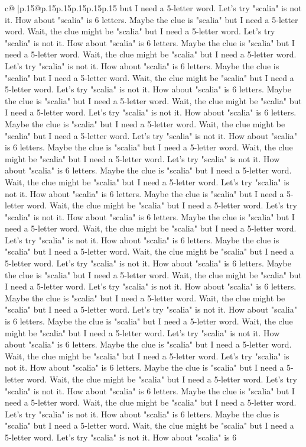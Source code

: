 \documentclass{article}
\begin{document}
{\begin{supertabular}{c@{$\;$}|p{.15\linewidth}@{}p{.15\linewidth}p{.15\linewidth}p{.15\linewidth}p{.15\linewidth}p{.15\linewidth}}
{{{but I need a 5{-}letter word. Let's try "scalia" is not it. How about "scalia" is 6 letters. Maybe the clue is "scalia" but I need a 5{-}letter word. Wait, the clue might be "scalia" but I need a 5{-}letter word. Let's try "scalia" is not it. How about "scalia" is 6 letters. Maybe the clue is "scalia" but I need a 5{-}letter word. Wait, the clue might be "scalia" but I need a 5{-}letter word. Let's try "scalia" is not it. How about "scalia" is 6 letters. Maybe the clue is "scalia" but I need a 5{-}letter word. Wait, the clue might be "scalia" but I need a 5{-}letter word. Let's try "scalia" is not it. How about "scalia" is 6 letters. Maybe the clue is "scalia" but I need a 5{-}letter word. Wait, the clue might be "scalia" but I need a 5{-}letter word. Let's try "scalia" is not it. How about "scalia" is 6 letters. Maybe the clue is "scalia" but I need a 5{-}letter word. Wait, the clue might be "scalia" but I need a 5{-}letter word. Let's try "scalia" is not it. How about "scalia" is 6 letters. Maybe the clue is "scalia" but I need a 5{-}letter word. Wait, the clue might be "scalia" but I need a 5{-}letter word. Let's try "scalia" is not it. How about "scalia" is 6 letters. Maybe the clue is "scalia" but I need a 5{-}letter word. Wait, the clue might be "scalia" but I need a 5{-}letter word. Let's try "scalia" is not it. How about "scalia" is 6 letters. Maybe the clue is "scalia" but I need a 5{-}letter word. Wait, the clue might be "scalia" but I need a 5{-}letter word. Let's try "scalia" is not it. How about "scalia" is 6 letters. Maybe the clue is "scalia" but I need a 5{-}letter word. Wait, the clue might be "scalia" but I need a 5{-}letter word. Let's try "scalia" is not it. How about "scalia" is 6 letters. Maybe the clue is "scalia" but I need a 5{-}letter word. Wait, the clue might be "scalia" but I need a 5{-}letter word. Let's try "scalia" is not it. How about "scalia" is 6 letters. Maybe the clue is "scalia" but I need a 5{-}letter word. Wait, the clue might be "scalia" but I need a 5{-}letter word. Let's try "scalia" is not it. How about "scalia" is 6 letters. Maybe the clue is "scalia" but I need a 5{-}letter word. Wait, the clue might be "scalia" but I need a 5{-}letter word. Let's try "scalia" is not it. How about "scalia" is 6 letters. Maybe the clue is "scalia" but I need a 5{-}letter word. Wait, the clue might be "scalia" but I need a 5{-}letter word. Let's try "scalia" is not it. How about "scalia" is 6 letters. Maybe the clue is "scalia" but I need a 5{-}letter word. Wait, the clue might be "scalia" but I need a 5{-}letter word. Let's try "scalia" is not it. How about "scalia" is 6 letters. Maybe the clue is "scalia" but I need a 5{-}letter word. Wait, the clue might be "scalia" but I need a 5{-}letter word. Let's try "scalia" is not it. How about "scalia" is 6 letters. Maybe the clue is "scalia" but I need a 5{-}letter word. Wait, the clue might be "scalia" but I need a 5{-}letter word. Let's try "scalia" is not it. How about "scalia" is 6 letters. Maybe the clue is "scalia" but I need a 5{-}letter word. Wait, the clue might be "scalia" but I need a 5{-}letter word. Let's try "scalia" is not it. How about "scalia" is 6 }}}
\end{supertabular}}
\end{document}
